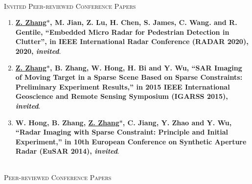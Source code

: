 \documentclass[paper=a4,fontsize=11pt]{scrartcl}
\begin{document}
~\\

\textsc{Invited Peer-reviewed Conference Papers}

\begin{enumerate}
	
\item \textbf{\underline{Z. Zhang$\ast$}, M. Jian, Z. Lu, H. Chen, S. James, C. Wang. and R. Gentile, ``Embedded Micro Radar for Pedestrian Detection in Clutter'', in IEEE International Radar Conference (RADAR 2020), 2020, \emph{invited}}.
   
\item \textbf{\underline{Z. Zhang$\ast$}, B. Zhang, W. Hong, H. Bi and Y. Wu, ``SAR Imaging of Moving Target in a Sparse Scene Based on Sparse Constraints: Preliminary Experiment Results,'' in 2015 IEEE International Geoscience and Remote Sensing Symposium (IGARSS 2015), \emph{invited}}.

\item \textbf{W. Hong, B. Zhang, \underline{Z. Zhang$\ast$}, C. Jiang, Y. Zhao and Y. Wu, ``Radar Imaging with Sparse Constraint: Principle and Initial Experiment,'' in 10th European Conference on Synthetic Aperture Radar (EuSAR 2014), \emph{invited}}.


\end{enumerate}

~\\

\textsc{Peer-reviewed Conference Papers}
\end{document}
